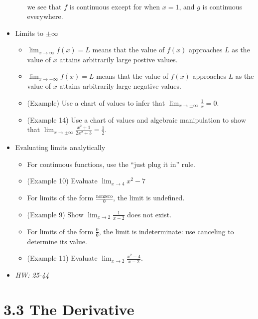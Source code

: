 \documentclass[11pt]{article}
\begin{document}
\begin{itemize}
\begin{itemize}
\[\begin{matrix}
        \end{matrix}
      \]
    we see that \(f\) is continuous except for when \(x=1\), and
    \(g\) is continuous everywhere.
  \end{itemize}
\item Limits to \(\pm\infty\)
  \begin{itemize}
    \item \(\lim_{x\to \infty}f(x)=L\) means that the value of \(f(x)\) approaches
          \(L\) as the value of \(x\) attains arbitrarily large postive values.
    \item \(\lim_{x\to -\infty}f(x)=L\) means that the value of \(f(x)\) approaches
          \(L\) as the value of \(x\) attains arbitrarily large negative values.
    \item (Example) Use a chart of values to infer that
          \(\lim_{x\to\pm\infty}\frac{1}{x}=0\).
    \item (Example 14) Use a chart of values and algebraic manipulation to
          show that \(\lim_{x\to\pm\infty}\frac{x^2+1}{2x^2+3}=\frac{1}{2}\).
  \end{itemize}
\item Evaluating limits analytically
  \begin{itemize}
    \item For continuous functions, use the ``just plug it in'' rule.
    \item (Example 10) Evaluate \(\lim_{x\to 4}x^2-7\)
    \item For limits of the form \(\frac{\text{nonzero}}{0}\), the limit is
          undefined.
    \item (Example 9) Show \(\lim_{x\to 2}\frac{1}{x-2}\) does not exist.
    \item For limits of the form \(\frac{0}{0}\), the limit is indeterminate:
          use canceling to determine its value.
    \item (Example 11) Evaluate \(\lim_{x\to 2}\frac{x^2-4}{x-2}\).
  \end{itemize}

\item\textit{
  HW: 25-44
}
\end{itemize}

\section*{3.3 The Derivative}
\end{document}
